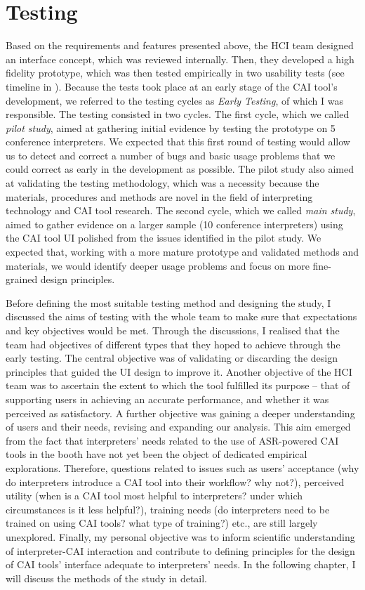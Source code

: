 \section{Testing}


Based on the requirements and features presented above, the HCI team designed an interface concept, which was reviewed internally. Then, they developed a high fidelity prototype, which was then tested empirically in two usability tests (see timeline in ).  Because the tests took place at an early stage of the CAI tool’s development, we referred to the testing cycles as \textit{Early Testing}, of which I was responsible. The testing consisted in two cycles. The first cycle, which we called \textit{pilot study}, aimed at gathering initial evidence by testing the prototype on 5 conference interpreters. We expected that this first round of testing would allow us to detect and correct a number of bugs and basic usage problems that we could correct as early in the development as possible. The pilot study also aimed at validating the testing methodology, which was a necessity because the materials, procedures and methods are novel in the field of interpreting technology and CAI tool research. The second cycle, which we called \textit{main study}, aimed to gather evidence on a larger sample (10 conference interpreters) using the CAI tool UI polished from the issues identified in the pilot study. We expected that, working with a more mature prototype and validated methods and materials, we would identify deeper usage problems and focus on more fine-grained design principles.



Before defining the most suitable testing method and designing the study, I discussed the aims of testing with the whole team to make sure that expectations and key objectives would be met. Through the discussions, I realised that the team had objectives of different types that they hoped to achieve through the early testing. The central objective was of validating or discarding the design principles that guided the UI design to improve it. Another objective of the HCI team was to ascertain the extent to which the tool fulfilled its purpose -- that of supporting users in achieving an accurate performance, and whether it was perceived as satisfactory. A further objective was gaining a deeper understanding of users and their needs, revising and expanding our analysis. This aim emerged from the fact that interpreters’ needs related to the use of ASR-powered CAI tools in the booth have not yet been the object of dedicated empirical explorations. Therefore, questions related to issues such as users’ acceptance (why do interpreters introduce a CAI tool into their workflow? why not?), perceived utility (when is a CAI tool most helpful to interpreters? under which circumstances is it less helpful?), training needs (do interpreters need to be trained on using CAI tools? what type of training?) etc., are still largely unexplored. Finally, my personal objective was to inform scientific understanding of interpreter-CAI interaction and contribute to defining principles for the design of CAI tools’ interface adequate to interpreters’ needs. In the following chapter, I will discuss the methods of the study in detail.
